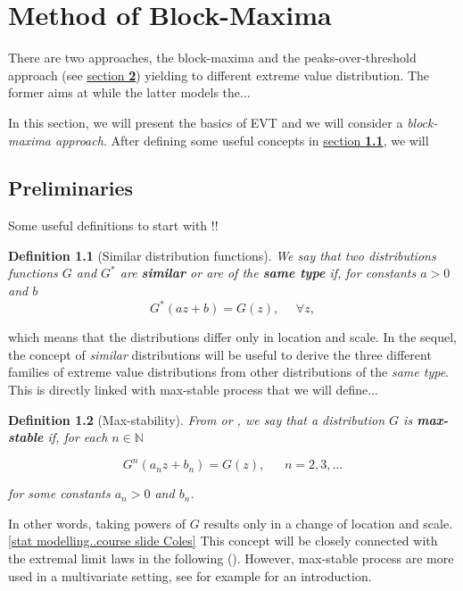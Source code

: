 \documentclass[11pt,a4paper,openany ]{book}
\newtheorem{definition}{Definition}[chapter]
\begin{document}
\setcounter{mtc}{3}
\chapter{Method of Block-Maxima} \label{sec::1}
\minitoc
 \vspace{1.5cm}

There are two approaches, the block-maxima  and the peaks-over-threshold approach (see 
\hyperref[sec::2]{section \textbf{2}}) yielding to different extreme value distribution. 
The former aims at while the latter models the...

In this section, we will present the basics of EVT and we will consider a 
\textit{block-maxima approach}. After defining some useful concepts in 
\hyperref[sec::1.1]{section \textbf{1.1}}, we will

\thispagestyle{empty}
\newpage
\section{Preliminaries}\label{sec::1.1}

Some useful definitions to start with !!
\theoremstyle{definition}
\begin{definition}[Similar distribution functions]\label{similardf} We say that two distributions functions $G$ and $G^*$ are \emph{\textbf{similar}} or are of the \emph{\textbf{same type}}
	if, for constants $a>0$ and $b$
	\begin{equation}\label{simm}
	G^*(az+b)=G(z), \ \ \ \ \ \ \forall z,
	\end{equation}
\end{definition}
which means that the distributions differ only in location and scale. 
In the sequel, the concept of \emph{similar} distributions will be useful to derive the three different families of extreme value distributions from other distributions of the \emph{same type}.
This is directly linked with max-stable process that we will define...

\begin{definition}[Max-stability] \label{maxstab}
	\emph{From \cite{leadbetter_extremes_1983} or \cite{resnick_extreme_1987}}, we say that a distribution $G$ is \emph{\textbf{max-stable}} if, for each $n\in\mathbb{N}$
	
	
	\begin{equation}
	G^n(a_nz+b_n)=G(z), \ \ \ \ \ \ \ n=2,3,...
	\end{equation}
	
	for some constants $a_n>0$ and $b_n$.
\end{definition}
In other words, taking powers of $G$ results only in a change of location and scale. \ref{stat modelling..course slide Coles} This concept will be closely connected with the extremal limit laws in the following ().
However, max-stable process are more used in a multivariate setting, see for example \citet{} for an introduction.
\end{document}
